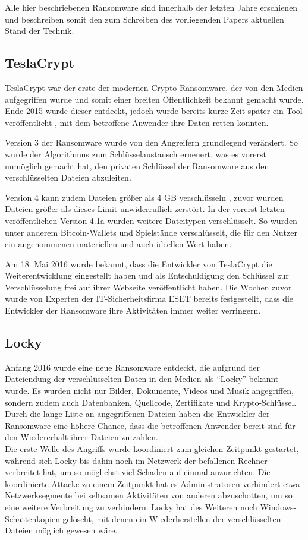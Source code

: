 Alle hier beschriebenen Ransomware sind innerhalb der letzten Jahre erschienen und beschreiben somit den zum Schreiben des vorliegenden Papers aktuellen Stand der Technik.

\subsection{TeslaCrypt}
TeslaCrypt war der erste der modernen Crypto-Ransomware, der von den Medien aufgegriffen wurde und somit einer breiten Öffentlichkeit bekannt gemacht wurde. Ende 2015 \cite{tesla:entdeckt} wurde dieser entdeckt, jedoch wurde bereits kurze Zeit später ein Tool veröffentlicht \cite{tesla:geknackt}, mit dem betroffene Anwender ihre Daten retten konnten.

Version 3 der Ransomware wurde von den Angreifern grundlegend verändert. So wurde der Algorithmus zum Schlüsselaustausch erneuert, was es vorerst unmöglich gemacht hat, den privaten Schlüssel der Ransomware aus den verschlüsselten Dateien abzuleiten. \cite{tesla:version3} \cite{tesla:version3_2}

Version 4 kann zudem Dateien größer als 4 GB verschlüsseln \cite{tesla:version4}, zuvor wurden Dateien größer als dieses Limit unwiderruflich zerstört. In der vorerst letzten veröffentlichen Version 4.1a \cite{tesla:version41} wurden weitere Dateitypen verschlüsselt. So wurden unter anderem Bitcoin-Wallets und Spielstände verschlüsselt, die für den Nutzer ein angenommenen materiellen und auch ideellen Wert haben.

Am 18. Mai 2016 wurde bekannt, dass die Entwickler von TeslaCrypt die Weiterentwicklung eingestellt haben und als Entschuldigung den Schlüssel zur Verschlüsselung frei auf ihrer Webseite veröffentlicht haben. Die Wochen zuvor wurde von Experten der IT-Sicherheitsfirma ESET bereits festgestellt, dass die Entwickler der Ransomware ihre Aktivitäten immer weiter verringern. \cite{tesla:end}

\subsection{Locky}
Anfang 2016\cite{locky:start} wurde eine neue Ransomware entdeckt, die aufgrund der Dateiendung der verschlüsselten Daten in den Medien als ``Locky'' bekannt wurde. Es wurden nicht nur Bilder, Dokumente, Videos und Musik angegriffen, sondern zudem auch Datenbanken, Quellcode, Zertifikate und Krypto-Schlüssel. Durch die lange Liste an angegriffenen Dateien haben die Entwickler der Ransomware eine höhere Chance, dass die betroffenen Anwender bereit sind für den Wiedererhalt ihrer Dateien zu zahlen.\\
Die erste Welle des Angriffs wurde koordiniert zum gleichen Zeitpunkt gestartet, während sich Locky bis dahin noch im Netzwerk der befallenen Rechner verbreitet hat, um so möglichst viel Schaden auf einmal anzurichten. Die koordinierte Attacke zu einem Zeitpunkt hat es Administratoren verhindert etwa Netzwerksegmente bei seltsamen Aktivitäten von anderen abzuschotten, um so eine weitere Verbreitung zu verhindern. Locky hat des Weiteren noch Windows-Schattenkopien gelöscht, mit denen ein Wiederherstellen der verschlüsselten Dateien möglich gewesen wäre.\\

